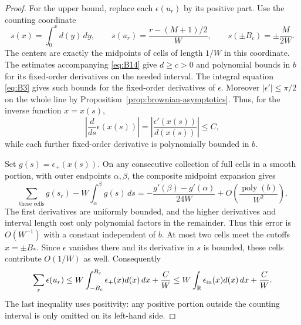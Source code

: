 \begin{proof}
For the upper bound, replace each $\epsilon(u_r)$ by its positive part.
Use the counting coordinate
\[
 s(x)=\int_0^x d(y)\,dy,
 \qquad s(u_r)=\frac{r-(M+1)/2}{W},
 \qquad s(\pm B_c)=\pm\frac{M}{2W}.
\]
The centers are exactly the midpoints of cells of length $1/W$ in this
coordinate.  The estimates accompanying \eqref{eq:B14} give $d\ge c>0$
and polynomial bounds in $b$ for its fixed-order derivatives on the
needed interval.  The integral equation \eqref{eq:B3} gives such bounds
for the fixed-order derivatives of $\epsilon$.  Moreover
$|\epsilon'|\le\pi/2$ on the whole line by
Proposition~\ref{prop:brownian-asymptotics}.  Thus, for
the inverse function $x=x(s)$,
\[
 \left|\frac{d}{ds}\epsilon(x(s))\right|
 =\left|\frac{\epsilon'(x(s))}{d(x(s))}\right|\le C,
\]
while each further fixed-order derivative is polynomially bounded in
$b$.

Set $g(s)=\epsilon_+(x(s))$.  On any consecutive collection of full
cells in a smooth portion, with outer endpoints $\alpha,\beta$, the
composite midpoint expansion gives
\[
 \sum_{\text{these cells}}g(s_r)
       -W\int_\alpha^\beta g(s)\,ds
 =-\frac{g'(\beta)-g'(\alpha)}{24W}
       +O\!\left(\frac{\operatorname{poly}(b)}{W^2}\right).
\]
The first derivatives are uniformly bounded, and the higher derivatives
and interval length cost only polynomial factors in the remainder.
Thus this error is $O(W^{-1})$ with a constant independent of $b$.
At most two cells meet the cutoffs
$x=\pm B_*$.  Since $\epsilon$ vanishes there and its derivative in
$s$ is bounded, these cells contribute $O(1/W)$ as well.  Consequently
\[
 \sum_r\epsilon(u_r)
 \le W\int_{-B_c}^{B_c}\epsilon_+(x)d(x)\,dx+\frac{C}{W}
 \le W\int_{\mathbb R}\epsilon_{\rm in}(x)d(x)\,dx+\frac{C}{W}.
\]
The last inequality uses positivity: any positive portion outside the
counting interval is only omitted on its left-hand side.


\end{proof}
